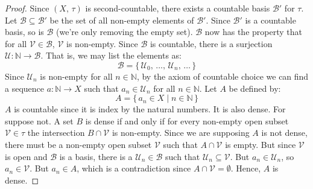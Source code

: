 \documentclass{article}
\theoremstyle{plain}
\theoremstyle{normal}
\begin{document}
        \begin{proof}
            Since $(X,\,\tau)$ is second-countable, there exists a countable
            basis $\mathcal{B}'$ for $\tau$. Let
            $\mathcal{B}\subseteq\mathcal{B}'$ be the set
            of all non-empty elements of $\mathcal{B}'$. Since
            $\mathcal{B}'$ is a countable basis, so is $\mathcal{B}$
            (we're only removing the empty set). $\mathcal{B}$ now has the
            property that for all $\mathcal{V}\in\mathcal{B}$,
            $\mathcal{V}$ is non-empty. Since $\mathcal{B}$ is countable, there
            is a surjection $\mathcal{U}:\mathbb{N}\rightarrow\mathcal{B}$. That
            is, we may list the elements as:
            \begin{equation}
                \mathcal{B}=
                \{\,\mathcal{U}_{0},\,\dots,\,\mathcal{U}_{n},\,\dots\,\}
            \end{equation}
            Since $\mathcal{U}_{n}$ is non-empty for all $n\in\mathbb{N}$, by
            the axiom of countable choice we can find a sequence
            $a:\mathbb{N}\rightarrow{X}$ such that $a_{n}\in\mathcal{U}_{n}$
            for all $n\in\mathbb{N}$. Let $A$ be defined by:
            \begin{equation}
                A=\{\,a_{n}\in{X}\;|\;n\in\mathbb{N}\,\}
            \end{equation}
            $A$ is countable since
            it is index by the natural numbers. It is also dense. For suppose
            not. A set $B$ is dense if and only if for every non-empty open
            subset $\mathcal{V}\in\tau$ the intersection $B\cap\mathcal{V}$ is
            non-empty. Since we are supposing $A$ is not dense, there must be a
            non-empty open subset $\mathcal{V}$ such that
            $A\cap\mathcal{V}$ is empty. But since $\mathcal{V}$ is open and
            $\mathcal{B}$ is a basis, there is a $\mathcal{U}_{n}\in\mathcal{B}$
            such that $\mathcal{U}_{n}\subseteq\mathcal{V}$. But
            $a_{n}\in\mathcal{U}_{n}$, so $a_{n}\in\mathcal{V}$. But
            $a_{n}\in{A}$, which is a contradiction since
            $A\cap\mathcal{V}=\emptyset$. Hence, $A$ is dense.
        \end{proof}
\end{document}
